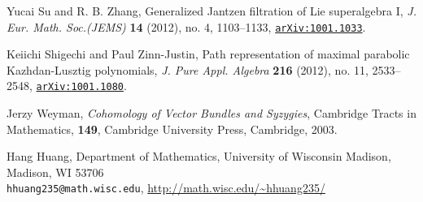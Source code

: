 \documentclass[12pt]{amsart}
\theoremstyle{definition}
\theoremstyle{remark}
\numberwithin{equation}{section}
\newcommand{\arxiv}[1]{\href{http://arxiv.org/abs/#1}{{\tt arXiv:#1}}}
\begin{document}
\begin{thebibliography}{SSam1}
 Yucai Su and R. B. Zhang, Generalized Jantzen filtration of Lie superalgebra I, {\it J. Eur. Math. Soc.(JEMS)} {\bf 14} (2012), no. 4, 1103--1133, \arxiv{1001.1033}.

 Keiichi Shigechi and Paul Zinn-Justin, Path representation of maximal parabolic Kazhdan-Lusztig polynomials, {\it J. Pure Appl. Algebra} {\bf 216} (2012), no. 11, 2533--2548, \arxiv{1001.1080}.

 Jerzy Weyman, {\it Cohomology of Vector Bundles
    and Syzygies}, Cambridge Tracts in Mathematics, {\bf 149},
  Cambridge University Press, Cambridge, 2003.

\end{thebibliography}

\small \noindent Hang Huang, Department of Mathematics,
University of Wisconsin Madison, Madison, WI 53706 \\
{\tt hhuang235@math.wisc.edu}, \url{http://math.wisc.edu/~hhuang235/}
\end{document}
